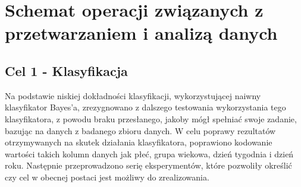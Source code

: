 \documentclass{classrep}
\begin{document}
    \section{Schemat operacji związanych z przetwarzaniem i analizą danych}
    \label{operation_schema} {

        \subsection{Cel 1 - Klasyfikacja} {
            Na podstawie niskiej dokładności klasyfikacji, wykorzystującej naiwny
            klasyfikator Bayes'a, zrezygnowano z dalszego testowania wykorzystania tego
            klasyfikatora, z powodu braku przesłanego, jakoby mógł spełniać swoje
            zadanie, bazując na danych z badanego zbioru danych.
            W celu poprawy rezultatów otrzymywanych na skutek działania klasyfikatora,
            poprawiono kodowanie wartości takich kolumn danych jak płeć, grupa wiekowa,
            dzień tygodnia i dzień roku. Następnie przeprowadzono serię eksperymentów,
            które pozwoliły określić czy cel w obecnej postaci jest możliwy do
            zrealizowania.
        }

    }
\end{document}
